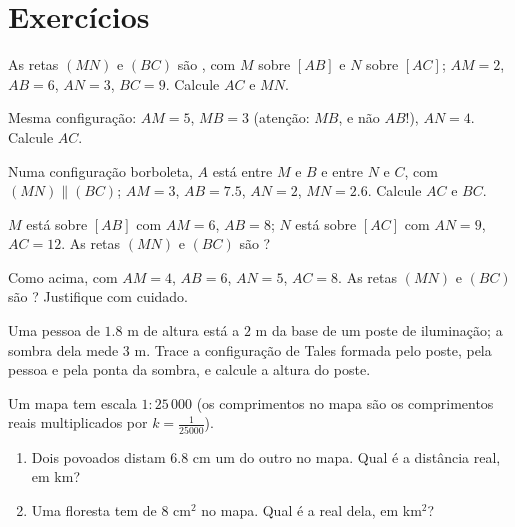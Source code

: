 \section{Exercícios}

\begin{exercise}[$\star$]\label{exo:g9:thales:1}
As retas $(MN)$ e $(BC)$ são , com $M$ sobre $[AB]$ e $N$
sobre $[AC]$; $AM = 2$, $AB = 6$, $AN = 3$, $BC = 9$. Calcule $AC$ e
$MN$.
\end{exercise}

\begin{exercise}[$\star$]\label{exo:g9:thales:2}
Mesma configuração: $AM = 5$, $MB = 3$ (atenção: $MB$, e não $AB$!),
$AN = 4$. Calcule $AC$.
\end{exercise}

\begin{exercise}[$\star$]\label{exo:g9:thales:3}
Numa configuração borboleta, $A$ está entre $M$ e $B$ e entre $N$ e
$C$, com $(MN) \parallel (BC)$; $AM = 3$, $AB = 7.5$, $AN = 2$,
$MN = 2.6$. Calcule $AC$ e $BC$.
\end{exercise}

\begin{exercise}[$\star$]\label{exo:g9:thales:4}
$M$ está sobre $[AB]$ com $AM = 6$, $AB = 8$; $N$ está sobre $[AC]$ com
$AN = 9$, $AC = 12$. As retas $(MN)$ e $(BC)$ são ?
\end{exercise}

\begin{exercise}[$\star\star$]\label{exo:g9:thales:5}
Como acima, com $AM = 4$, $AB = 6$, $AN = 5$, $AC = 8$. As retas $(MN)$
e $(BC)$ são ? Justifique com cuidado.
\end{exercise}

\begin{exercise}[$\star\star$]\label{exo:g9:thales:6}
Uma pessoa de $1.8$ m de altura está a $2$ m da base de um poste de
iluminação; a sombra dela mede $3$ m. Trace a configuração de Tales
formada pelo poste, pela pessoa e pela ponta da sombra, e calcule a
altura do poste.
\end{exercise}

\begin{exercise}[$\star\star$]\label{exo:g9:thales:7}
Um mapa tem escala $1 : 25\,000$ (os comprimentos no mapa são os
comprimentos reais multiplicados por $k = \frac{1}{25000}$).
\begin{enumerate}
  \item Dois povoados distam $6.8$ cm um do outro no mapa. Qual é a
        distância real, em km?
  \item Uma floresta tem  de $8$ cm$^2$ no mapa. Qual é a  real
        dela, em km$^2$?
\end{enumerate}
\end{exercise}

